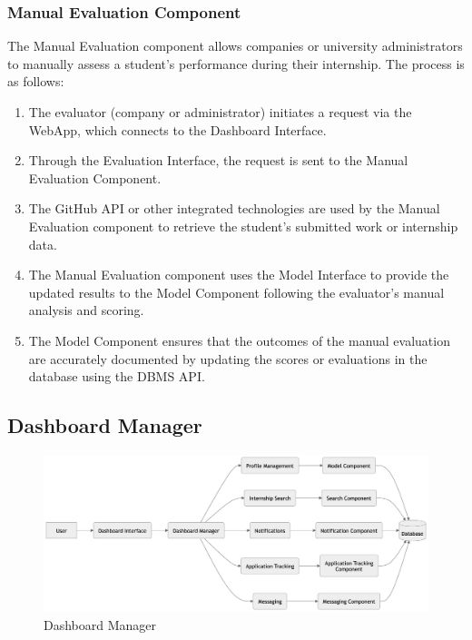 \subsubsection{Manual Evaluation Component}
The Manual Evaluation component allows companies or university administrators to manually assess a student’s performance during their internship. The process is as follows:
\begin{enumerate}
    \item The evaluator (company or administrator) initiates a request via the WebApp, which connects to the Dashboard Interface.
    \item Through the Evaluation Interface, the request is sent to the Manual Evaluation Component.
    \item The GitHub API or other integrated technologies are used by the Manual Evaluation component to retrieve the student's submitted work or internship data.
    \item The Manual Evaluation component uses the Model Interface to provide the updated results to the Model Component following the evaluator's manual analysis and scoring.
    \item The Model Component ensures that the outcomes of the manual evaluation are accurately documented by updating the scores or evaluations in the database using the DBMS API.
\end{enumerate}

\subsection{Dashboard Manager}
\label{subsubsec:dashboard_manager}

\begin{figure}[H]
    \begin{center}
        \includegraphics[width=0.82\linewidth]{JhaBhatiaSharma/imagesDD/DashboardManager.png}
        \caption{Dashboard Manager}
        \label{fig:dashboardmanager}%
    \end{center}
\end{figure}

